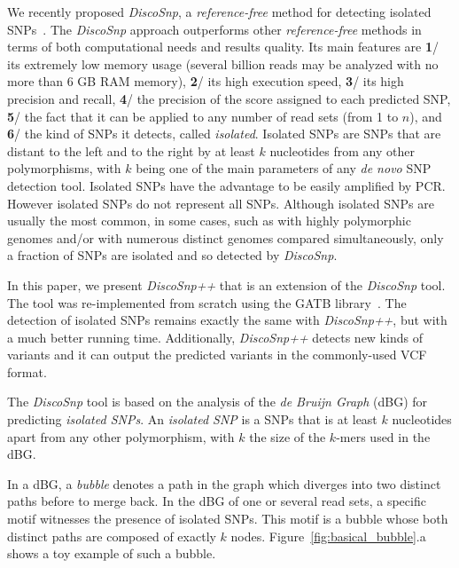 \documentclass{bmcart}
\newcommand{\disco}{{\it DiscoSnp}\xspace}
\newcommand{\discopp}{{\it DiscoSnp++}\xspace}
\begin{document}
We recently proposed \disco, a \emph{reference-free} method for detecting isolated SNPs~\cite{Uricaru2014a}. The \disco approach outperforms other \emph{reference-free} methods in terms of both computational needs and results quality. Its main features are \textbf{1}/ its extremely low memory usage (several billion reads may be analyzed with no more than 6 GB RAM memory), \textbf{2}/ its high execution speed, \textbf{3}/ its high precision and recall, \textbf{4}/ the precision of the score assigned to each predicted SNP, \textbf{5}/ the fact that it can be applied to any number of read sets (from 1 to $n$), and \textbf{6}/ the kind of SNPs it detects, called \emph{isolated}. Isolated SNPs are SNPs that are distant to the left and to the right by at least $k$ nucleotides from any other polymorphisms, with $k$ being one of the main parameters of any \emph{de novo}
SNP detection tool. Isolated SNPs have the advantage to be easily amplified by PCR. However isolated SNPs do not represent all SNPs. Although isolated SNPs are usually the most common, in some cases, such as with highly polymorphic genomes and/or with numerous distinct genomes compared simultaneously, only a fraction of SNPs are isolated and so detected by \disco.


In this paper, we present \discopp that is an extension of the \disco tool. The tool was re-implemented from scratch using the GATB library~\cite{Drezen2014}. The detection of isolated SNPs remains exactly the same with \discopp, but with a much better running time. Additionally, \discopp detects new kinds of variants and it can output the predicted variants in the commonly-used VCF format.  

The \disco tool is based on the analysis of the \emph{de Bruijn Graph} (dBG) for predicting \emph{isolated SNPs}. An \emph{isolated SNP} is a SNPs that is at least $k$ nucleotides apart from any other polymorphism, with $k$ the size of the $k$-mers used in the dBG. 

In a dBG, a \emph{bubble} denotes a path in the graph which diverges into two distinct paths before to merge back. In the dBG of one or several read sets, a specific motif witnesses the presence of isolated SNPs. This motif is a bubble whose both distinct paths are composed of exactly $k$ nodes. Figure~\ref{fig:basical_bubble}.a shows a toy example of such a bubble. 
\end{document}

